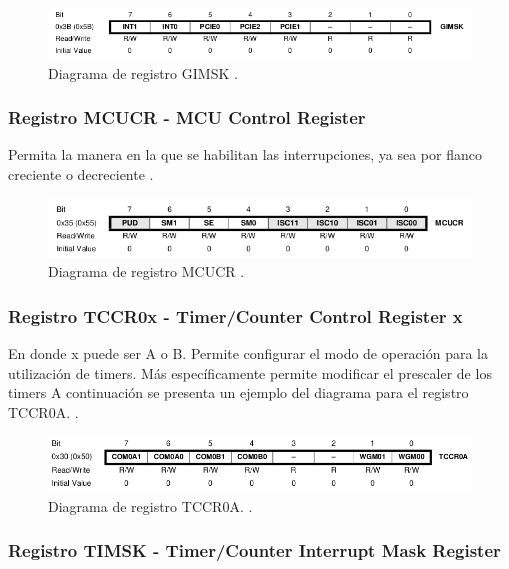 \begin{figure}[H]
\centering
\includegraphics[scale=0.9]{./images/GIMSK.png} 
\caption{Diagrama de registro GIMSK \cite{datasheet}.}
\label{f1}
\end{figure}

\subsubsection{Registro MCUCR - MCU Control Register}
Permita la manera en la que se habilitan las interrupciones, ya sea por flanco creciente o decreciente \cite{datasheet}.
\begin{figure}[H]
\centering
\includegraphics[scale=1]{./images/MCUCR.png} 
\caption{Diagrama de registro MCUCR \cite{datasheet}.}
\label{f1}
\end{figure}

\subsubsection{Registro TCCR0x - Timer/Counter Control Register x}
En donde x puede ser A o B.
Permite configurar el modo de operación para la utilización de timers. Más específicamente permite modificar el prescaler de los timers A continuación se presenta un ejemplo del diagrama para el registro TCCR0A.  \cite{datasheet}.

\begin{figure}[H]
\centering
\includegraphics[scale=0.8]{./images/TCCR0A.png} 
\caption{Diagrama de registro TCCR0A. \cite{datasheet}.}
\label{f1}
\end{figure}

\subsubsection{Registro TIMSK - Timer/Counter Interrupt Mask Register}

